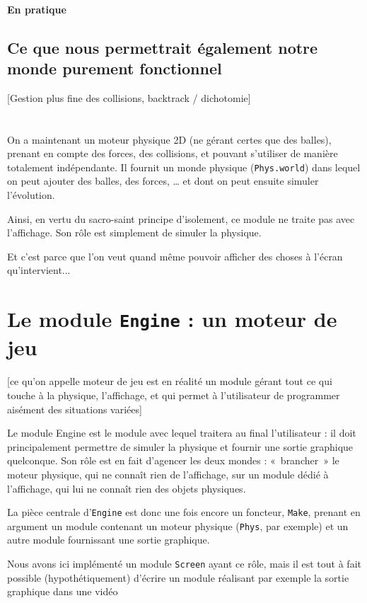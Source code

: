 \documentclass[a4paper]{scrartcl}
\begin{document}
\paragraph{En pratique}
\subsection{Ce que nous permettrait également notre monde purement
  fonctionnel}
[Gestion plus fine des collisions, backtrack / dichotomie]

\section*{}
On a maintenant un moteur physique 2D (ne gérant certes que des
balles), prenant en compte des forces, des collisions, et pouvant
s'utiliser de manière totalement indépendante. Il fournit un monde
physique (\texttt{Phys.world}) dans lequel on peut ajouter des balles,
des forces, … et dont on peut ensuite simuler l'évolution.

Ainsi, en vertu du sacro-saint principe d'isolement, ce module ne
traite pas avec l'affichage. Son rôle est simplement de simuler la
physique.

Et c'est parce que l'on veut quand même pouvoir afficher des choses à
l'écran qu'intervient...

\section{Le module \texttt{Engine} : un moteur de jeu}

[ce qu'on appelle moteur de jeu est en réalité un module gérant tout
ce qui touche à la physique, l'affichage, et qui permet à
l'utilisateur de programmer aisément des situations variées]

Le module Engine est le module avec lequel traitera au final
l'utilisateur : il doit principalement permettre de simuler la
physique et fournir une sortie graphique quelconque. Son rôle est en
fait d'agencer les deux mondes : «~brancher~» le moteur physique, qui
ne connaît rien de l'affichage, sur un module dédié à l'affichage, qui
lui ne connaît rien des objets physiques.

La pièce centrale d'\texttt{Engine} est donc une fois encore un
foncteur, \texttt{Make}, prenant en argument un module contenant un
moteur physique (\texttt{Phys}, par exemple) et un autre module
fournissant une sortie graphique.

Nous avons ici implémenté un module \texttt{Screen} ayant ce rôle,
mais il est tout à fait possible (hypothétiquement) d'écrire un module
réalisant par exemple la sortie graphique dans une vidéo
\end{document}
